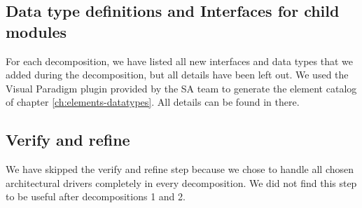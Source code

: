 \documentclass[english]{sareport}
\begin{document}
\begin{appendices}
        \subsection{Data type definitions and Interfaces for child modules}
            For each decomposition, we have listed all new interfaces and data types
            that we added during the decomposition, but all details have been left out.
            We used the Visual Paradigm plugin provided by the SA team to generate
            the element catalog of chapter \ref{ch:elements-datatypes}. All details
            can be found in there.

        \subsection{Verify and refine}
            We have skipped the verify and refine step because we chose to
            handle all chosen architectural drivers completely in every decomposition.
            We did not find this step to be useful after decompositions 1 and 2.

    \newpage
    
    \newpage
    
    \newpage
    \newpage
    \newpage
    \newpage

\end{appendices}
\end{document}

